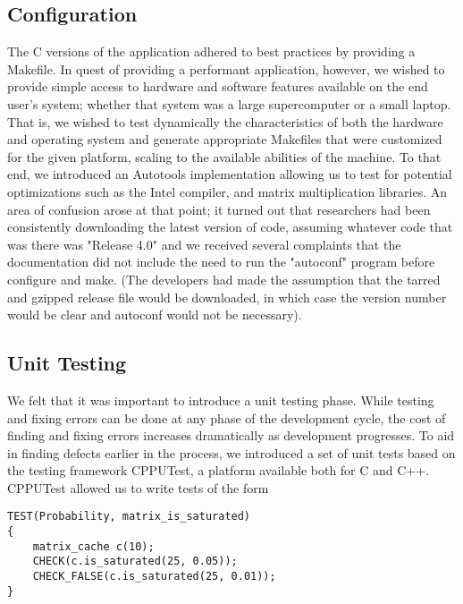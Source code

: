 \documentclass[acmtog, authorversion]{acmart}
\begin{document}
\subsection{Configuration}
The C versions of the application adhered to best practices by providing a Makefile. In quest of providing a performant application, however, we wished to provide simple access to hardware and software features available on the end user's system; whether that system was a large supercomputer or a small laptop. That is, we wished to test dynamically the characteristics of both the hardware and operating system and generate appropriate Makefiles that were customized for the given platform, scaling to the available abilities of the machine. To that end, we introduced an Autotools \cite{Hagen2006} implementation allowing us to test for potential optimizations such as the Intel compiler, and matrix multiplication libraries. An area of confusion arose at that point; it turned out that researchers had been consistently downloading the latest version of code, assuming whatever code that was there was "Release 4.0" and we received several complaints that the documentation did not include the need to run the "autoconf" program before configure and make. (The developers had made the assumption that the tarred and gzipped release file would be downloaded, in which case the version number would be clear and autoconf would not be necessary).



\subsection{Unit Testing}
    We felt that it was important to introduce a unit testing phase. While testing 
    and fixing errors can be done at any phase of the development cycle, the cost of finding and fixing errors increases dramatically as development progresses.
    To aid in finding defects earlier in the process, we introduced a set of unit tests based on the testing framework CPPUTest, a platform available both
    for C and C++.  CPPUTest allowed us to write tests of the form

\begin{lstlisting}
TEST(Probability, matrix_is_saturated)
{
    matrix_cache c(10);
    CHECK(c.is_saturated(25, 0.05));
    CHECK_FALSE(c.is_saturated(25, 0.01));
}
\end{lstlisting}
\end{document}
